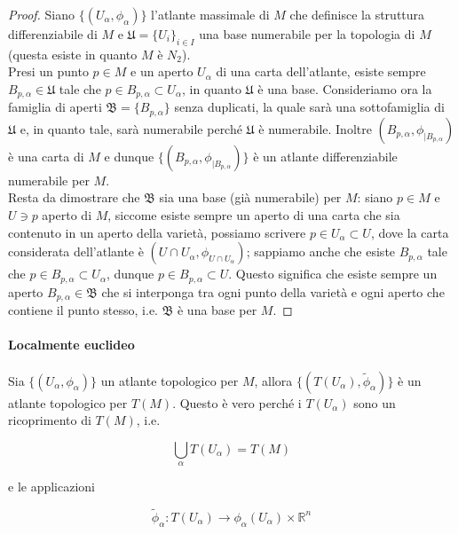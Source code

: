 \begin{proof}
	Siano $ \{(U_{\alpha},\phi_{\alpha})\} $ l'atlante massimale di $ M $ che definisce la struttura differenziabile di $ M $ e $ \mathfrak{U} = \{U_{i}\}_{i \in I} $ una base numerabile per la topologia di $ M $ (questa esiste in quanto $ M $ è $ N_{2} $).\\
	Presi un punto $ p \in M $ e un aperto $ U_{\alpha} $ di una carta dell'atlante, esiste sempre $ B_{p,\alpha} \in \mathfrak{U} $ tale che $ p \in B_{p,\alpha} \subset U_{\alpha} $, in quanto $ \mathfrak{U} $ è una base. Consideriamo ora la famiglia di aperti $ \mathfrak{B} = \{B_{p,\alpha}\} $ senza duplicati, la quale sarà una sottofamiglia di $ \mathfrak{U} $ e, in quanto tale, sarà numerabile perché $ \mathfrak{U} $ è numerabile. Inoltre $ (B_{p,\alpha}, \phi_{|B_{p,\alpha}}) $ è una carta di $ M $ e dunque $ \{(B_{p,\alpha}, \phi_{|B_{p,\alpha}})\} $ è un atlante differenziabile numerabile per $ M $.\\
	Resta da dimostrare che $ \mathfrak{B} $ sia una base (già numerabile) per $ M $: siano $ p \in M $ e $ U \ni p $ aperto di $ M $, siccome esiste sempre un aperto di una carta che sia contenuto in un aperto della varietà, possiamo scrivere $ p \in U_{\alpha} \subset U $, dove la carta considerata dell'atlante è $ (U \cap U_{\alpha},\phi_{U \cap U_{\alpha}}) $; sappiamo anche che esiste $ B_{p,\alpha} $ tale che $ p \in B_{p,\alpha} \subset U_{\alpha} $, dunque $ p \in B_{p,\alpha} \subset U $. Questo significa che esiste sempre un aperto $ B_{p,\alpha} \in \mathfrak{B} $ che si interponga tra ogni punto della varietà e ogni aperto che contiene il punto stesso, i.e. $ \mathfrak{B} $ è una base per $ M $.
\end{proof}

\paragraph{Localmente euclideo}

Sia $ \{(U_{\alpha},\phi_{\alpha})\} $ un atlante topologico per $ M $, allora $ \{(T(U_{\alpha}),\tilde{\phi}_{\alpha})\} $ è un atlante topologico per $ T(M) $. Questo è vero perché i $ T(U_{\alpha}) $ sono un ricoprimento di $ T(M) $, i.e.

\begin{equation}
	\bigcup_{\alpha} T(U_{\alpha}) = T(M)
\end{equation}

e le applicazioni

\begin{equation}
	\tilde{\phi}_{\alpha} : T(U_{\alpha}) \to \phi_{\alpha}(U_{\alpha}) \times \mathbb{R}^{n}
\end{equation}

